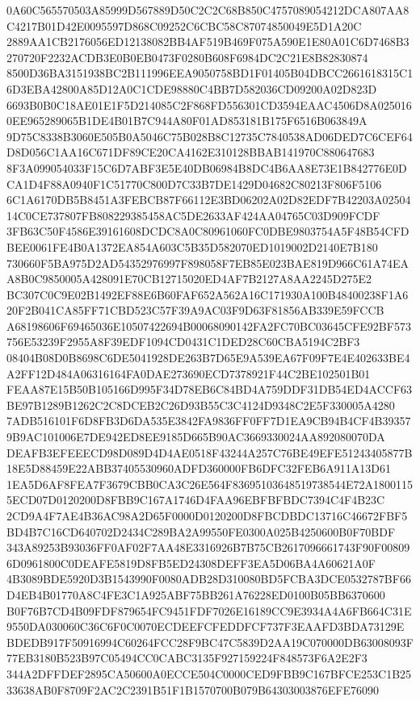 \documentclass[UTF8,fontset=fandol,zihao=-4,a4paper]{ctexart}
\begin{document}
{{0A60C565570503A85999D567889D50C2C2C68B850C4757089054212DCA807AA8C4217B01D42E0095597D868C09252C6CBC58C87074850049E5D1A20C
2889AA1CB2176056ED12138082BB4AF519B469F075A590E1E80A01C6D7468B3270720F2232ACDB3E0B0EB0473F0280B608F6984DC2C21E8B82830874
8500D36BA3151938BC2B111996EEA9050758BD1F01405B04DBCC2661618315C16D3EBA42800A85D12A0C1CDE98880C4BB7D582036CD09200A02D823D
6693B0B0C18AE01E1F5D214085C2F868FD556301CD3594EAAC4506D8A0250160EE965289065B1DE4B01B7C944A80F01AD853181B175F6516B063849A
9D75C8338B3060E505B0A5046C75B028B8C12735C7840538AD06DED7C6CEF64D8D056C1AA16C671DF89CE20CA4162E310128BBAB141970C880647683
8F3A099054033F15C6D7ABF3E5E40DB06984B8DC4B6AA8E73E1B842776E0DCA1D4F88A0940F1C51770C800D7C33B7DE1429D04682C80213F806F5106
6C1A6170DB5B8451A3FEBCB87F66112E3BD06202A02D82EDF7B42203A0250414C0CE737807FB808229385458AC5DE2633AF424AA04765C03D909FCDF
3FB63C50F4586E39161608DCDC8A0C80961060FC0DBE9803754A5F48B54CFDBEE0061FE4B0A1372EA854A603C5B35D582070ED1019002D2140E7B180
730660F5BA975D2AD54352976997F898058F7EB85E023BAE819D966C61A74EAA8B0C9850005A428091E70CB12715020ED4AF7B2127A8AA2245D275E2
BC307C0C9E02B1492EF88E6B60FAF652A562A16C171930A100B48400238F1A620F2B041CA85FF71CBD523C57F39A9AC03F9D63F81856AB339E59FCCB
A68198606F69465036E10507422694B00068090142FA2FC70BC03645CFE92BF573756E53239F2955A8F39EDF1094CD0431C1DED28C60CBA5194C2BF3
08404B08D0B8698C6DE5041928DE263B7D65E9A539EA67F09F7E4E402633BE4A2FF12D484A06316164FA0DAE273690ECD7378921F44C2BE102501B01
FEAA87E15B50B105166D995F34D78EB6C84BD4A759DDF31DB54ED4ACCF63BE97B1289B1262C2C8DCEB2C26D93B55C3C4124D9348C2E5F330005A4280
7ADB516101F6D8FB3D6DA535E3842FA9836FF0FF7D1EA9CB94B4CF4B393579B9AC101006E7DE942ED8EE9185D665B90AC3669330024AA892080070DA
DEAFB3EFEEECD98D089D4D4AE0518F43244A257C76BE49EFE51243405877B18E5D88459E22ABB37405530960ADFD360000FB6DFC32FEB6A911A13D61
1EA5D6AF8FEA7F3679CBB0CA3C26E564F83695103648519738544E72A18001155ECD07D0120200D8FBB9C167A1746D4FAA96EBFBFBDC7394C4F4B23C
2CD9A4F7AE4B36AC98A2D65F0000D0120200D8FBCDBDC13716C46672FBF5BD4B7C16CD640702D2434C289BA2A99550FE0300A025B4250600B0F70BDF
343A89253B93036FF0AF02F7AA48E3316926B7B75CB2617096661743F90F008096D0961800C0DEAFE5819D8FB5ED24308DEFF3EA5D06BA4A60621A0F
4B3089BDE5920D3B1543990F0080ADB28D310080BD5FCBA3DCE0532787BF66D4EB4B01770A8C4FE3C1A925ABF75BB261A76228ED0100B05BB6370600
B0F76B7CD4B09FDF879654FC9451FDF7026E16189CC9E3934A4A6FB664C31E9550DA030060C36C6F0C0070ECDEEFCFEDDFCF737F3EAAFD3BDA73129E
BDEDB917F50916994C60264FCC28F9BC47C5839D2AA19C070000DB63008093F77EB3180B523B97C05494CC0CABC3135F927159224F848573F6A2E2F3
344A2DFFDEF2895CA50600A0ECCE504C0000CED9FBB9C167BFCE253C1B2533638AB0F8709F2AC2C2391B51F1B1570700B079B64303003876EFE76090
}}
\end{document}

